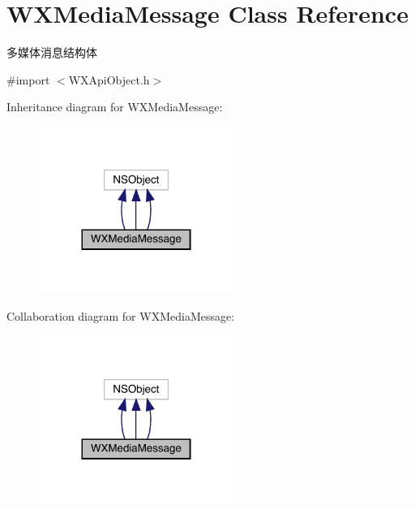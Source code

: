 \hypertarget{interface_w_x_media_message}{}\section{W\+X\+Media\+Message Class Reference}
\label{interface_w_x_media_message}


多媒体消息结构体  




{\ttfamily \#import $<$W\+X\+Api\+Object.\+h$>$}



Inheritance diagram for W\+X\+Media\+Message\+:\nopagebreak
\begin{figure}[H]
\begin{center}
\leavevmode
\includegraphics[width=180pt]{interface_w_x_media_message__inherit__graph}
\end{center}
\end{figure}


Collaboration diagram for W\+X\+Media\+Message\+:\nopagebreak
\begin{figure}[H]
\begin{center}
\leavevmode
\includegraphics[width=180pt]{interface_w_x_media_message__coll__graph}
\end{center}
\end{figure}
